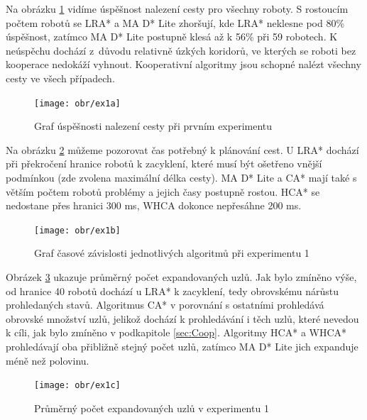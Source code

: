 Na obrázku \ref{obr:ex1a} vidíme úspěšnost nalezení cesty pro všechny roboty. S rostoucím počtem robotů se LRA* a MA D* Lite zhoršují, kde LRA* neklesne pod 80\% úspěšnost, zatímco MA D* Lite postupně klesá až k 56\% při 59 robotech. K neúspěchu dochází z~důvodu relativně úzkých koridorů, ve kterých se roboti bez kooperace nedokáží vyhnout. Kooperativní algoritmy jsou schopné nalézt všechny cesty ve všech případech.

\vspace*{-10mm}
\begin{figure}[H]
	\begin{center}
		\texttt{[image: obr/ex1a]}
	\end{center}
\vspace*{-10mm}
	\caption[caption]{Graf úspěšnosti nalezení cesty při prvním experimentu}
	\label{obr:ex1a}
\end{figure}

Na obrázku \ref{obr:ex1b} můžeme pozorovat čas potřebný k plánování cest. U LRA* dochází při překročení hranice robotů k zacyklení, které musí být ošetřeno vnější podmínkou (zde zvolena maximální délka cesty). MA D* Lite a CA* mají také s větším počtem robotů problémy a jejich časy postupně rostou. HCA* se nedostane přes hranici 300 ms, WHCA dokonce nepřesáhne 200 ms.

\vspace*{-10mm}
\begin{figure}[H]
\begin{center}
	\texttt{[image: obr/ex1b]}
\end{center}
\vspace*{-10mm}
\caption[caption]{Graf časové závislosti jednotlivých algoritmů při experimentu 1}
\label{obr:ex1b}
\end{figure}

Obrázek \ref{obr:ex1c} ukazuje průměrný počet expandovaných uzlů. Jak bylo zmíněno výše, od hranice 40 robotů dochází u LRA* k zacyklení, tedy obrovskému nárůstu prohledaných stavů. Algoritmus CA* v porovnání s ostatními prohledává obrovské množství uzlů, jelikož dochází k prohledávání i těch uzlů, které nevedou k cíli, jak bylo zmíněno v podkapitole \ref{sec:Coop}. Algoritmy HCA* a WHCA* prohledávají oba přibližně stejný počet uzlů, zatímco MA D* Lite jich expanduje méně než polovinu. 

\vspace*{-10mm}
\begin{figure}[H]
\begin{center}
	\texttt{[image: obr/ex1c]}
\end{center}
\vspace*{-10mm}
\caption[caption]{Průměrný počet expandovaných uzlů v experimentu 1}
\label{obr:ex1c}
\end{figure}

